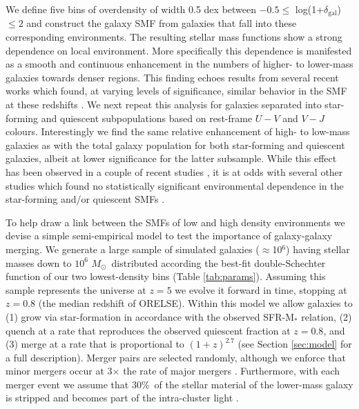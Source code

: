 \documentclass[a4paper,fleqn,usenatbib]{mnras}
\def\msol{$M_{\odot}$}
\begin{document}
We define five bins of overdensity of width 0.5 dex between $-0.5 \leq$ log(1+$\delta_{\mathrm{gal}}$) $\leq 2$ and construct the galaxy SMF from galaxies that fall into these corresponding environments.
The resulting stellar mass functions show a strong dependence on local environment.
More specifically this dependence is manifested as a smooth and continuous enhancement in the numbers of higher- to lower-mass galaxies towards denser regions.
This finding echoes results from several recent works which found, at varying levels of significance, similar behavior in the SMF at these redshifts \citep{Bolzonella2010, Vulcani2012, vanderBurg2013, Mortlock2015, Davidzon2016}.
We next repeat this analysis for galaxies separated into star-forming and quiescent subpopulations based on rest-frame $U - V$ and $V - J$ colours.
Interestingly we find the same relative enhancement of high- to low-mass galaxies as with the total galaxy population for both star-forming and quiescent galaxies, albeit at lower significance for the latter subsample.
While this effect has been observed in a couple of recent studies \citep{Vulcani2012, Davidzon2016}, it is at odds with several other studies which found no statistically significant environmental dependence in the star-forming and/or quiescent SMFs \citep{Peng2010, Bolzonella2010, Giodini2012, Vulcani2013, vanderBurg2013}.


To help draw a link between the SMFs of low and high density environments we devise a simple semi-empirical model to test the importance of galaxy-galaxy merging.
We generate a large sample of simulated galaxies ($\approx$10$^6$) having stellar masses down to $10^6$ \msol\ distributed according the best-fit double-Schechter function of our two lowest-density bins (Table \ref{tab:params}).
Assuming this sample represents the universe at $z=5$ we evolve it forward in time, stopping at $z=0.8$ (the median redshift of ORELSE).
Within this model we allow galaxies to (1) grow via star-formation in accordance with the observed SFR-M$_*$ relation, (2) quench at a rate that reproduces the observed quiescent fraction at $z=0.8$, and (3) merge at a rate that is proportional to $(1+z)^{2.7}$ (see Section \ref{sec:model} for a full description).
Merger pairs are selected randomly, although we enforce that minor mergers occur at 3$\times$ the rate of major mergers \citep{Lotz2011}.
Furthermore, with each merger event we assume that 30\%\ of the stellar material of the lower-mass galaxy is stripped and becomes part of the intra-cluster light \citep{Somerville2008, Contini2014}.
\end{document}
